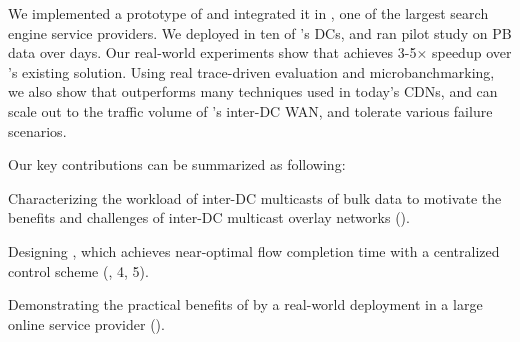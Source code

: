 We implemented a prototype of \name and integrated it in
\company,
one of the largest search engine service
providers. We deployed \name in ten of \company's DCs, and
ran pilot study on \fillme PB data over \fillme days. Our
real-world experiments show that \name achieves 3-5$\times$
speedup over \company's existing solution.
Using real trace-driven evaluation and microbanchmarking,
we also show that \name outperforms many techniques used in
today's CDNs, and \name can scale out to the traffic volume
of \company's inter-DC WAN, and tolerate various failure
scenarios.


Our key contributions can be summarized as following:
\begin{packeditemize}
\item Characterizing the workload of inter-DC multicasts of bulk data
to motivate the benefits and challenges of inter-DC multicast overlay
networks ().
\item Designing \name, which achieves near-optimal flow completion
time with a centralized control scheme (, 4, 5).
\item Demonstrating the practical benefits of \name by a real-world
 deployment in a large online service provider ().
\end{packeditemize}
